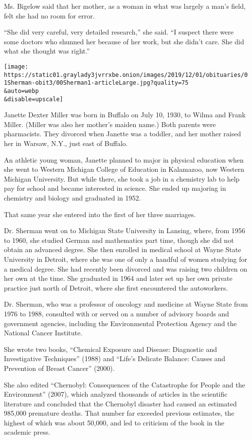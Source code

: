 Ms. Bigelow said that her mother, as a woman in what was largely a man's
field, felt she had no room for error.

``She did very careful, very detailed research,'' she said. ``I suspect
there were some doctors who shunned her because of her work, but she
didn't care. She did what she thought was right.''

\texttt{[image: https://static01.graylady3jvrrxbe.onion/images/2019/12/01/obituaries/01Sherman-obit3/00Sherman1-articleLarge.jpg?quality=75\\\&auto=webp\\\&disable=upscale]}

Janette Dexter Miller was born in Buffalo on July 10, 1930, to Wilma and
Frank Miller. (Miller was also her mother's maiden name.) Both parents
were pharmacists. They divorced when Janette was a toddler, and her
mother raised her in Warsaw, N.Y., just east of Buffalo.

An athletic young woman, Janette planned to major in physical education
when she went to Western Michigan College of Education in Kalamazoo, now
Western Michigan University. But while there, she took a job in a
chemistry lab to help pay for school and became interested in science.
She ended up majoring in chemistry and biology and graduated in 1952.

That same year she entered into the first of her three marriages.

Dr. Sherman went on to Michigan State University in Lansing, where, from
1956 to 1960, she studied German and mathematics part time, though she
did not obtain an advanced degree. She then enrolled in medical school
at Wayne State University in Detroit, where she was one of only a
handful of women studying for a medical degree. She had recently been
divorced and was raising two children on her own at the time. She
graduated in 1964 and later set up her own private practice just north
of Detroit, where she first encountered the autoworkers.

Dr. Sherman, who was a professor of oncology and medicine at Wayne State
from 1976 to 1988, consulted with or served on a number of advisory
boards and government agencies, including the Environmental Protection
Agency and the National Cancer Institute.

She wrote two books, ``Chemical Exposure and Disease: Diagnostic and
Investigative Techniques'' (1988) and ``Life's Delicate Balance: Causes
and Prevention of Breast Cancer'' (2000).

She also edited ``Chernobyl: Consequences of the Catastrophe for People
and the Environment'' (2007), which analyzed thousands of articles in
the scientific literature and concluded that the Chernobyl disaster had
caused an estimated 985,000 premature deaths. That number far exceeded
previous estimates, the highest of which was about 50,000, and led to
criticism of the book in the academic press.

